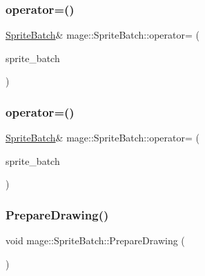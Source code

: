 \subsubsection{\texorpdfstring{operator=()}{operator=()}\hspace{0.1cm}{\footnotesize\ttfamily [1/2]}}
{\footnotesize\ttfamily \hyperlink{classmage_1_1_sprite_batch}{Sprite\+Batch}\& mage\+::\+Sprite\+Batch\+::operator= (\begin{DoxyParamCaption}\item[{const \hyperlink{classmage_1_1_sprite_batch}{Sprite\+Batch} \&}]{sprite\+\_\+batch }\end{DoxyParamCaption})\hspace{0.3cm}{\ttfamily [delete]}}

\hypertarget{classmage_1_1_sprite_batch_ad46c172200bf47c10fa13fb3a70a4104}{}\label{classmage_1_1_sprite_batch_ad46c172200bf47c10fa13fb3a70a4104} 
\subsubsection{\texorpdfstring{operator=()}{operator=()}\hspace{0.1cm}{\footnotesize\ttfamily [2/2]}}
{\footnotesize\ttfamily \hyperlink{classmage_1_1_sprite_batch}{Sprite\+Batch}\& mage\+::\+Sprite\+Batch\+::operator= (\begin{DoxyParamCaption}\item[{\hyperlink{classmage_1_1_sprite_batch}{Sprite\+Batch} \&\&}]{sprite\+\_\+batch }\end{DoxyParamCaption})\hspace{0.3cm}{\ttfamily [delete]}}

\hypertarget{classmage_1_1_sprite_batch_a64542c95cf98e30dcdfdec0b24dbc2a9}{}\label{classmage_1_1_sprite_batch_a64542c95cf98e30dcdfdec0b24dbc2a9} 
\subsubsection{\texorpdfstring{Prepare\+Drawing()}{PrepareDrawing()}}
{\footnotesize\ttfamily void mage\+::\+Sprite\+Batch\+::\+Prepare\+Drawing (\begin{DoxyParamCaption}{ }\end{DoxyParamCaption})\hspace{0.3cm}{\ttfamily [private]}}


